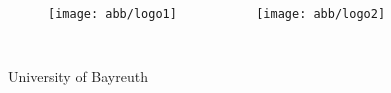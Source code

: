 


%


\thispagestyle{empty}


\begin{figure}[t]
 \centering
 \texttt{[image: abb/logo1]}
~~~~~~~~~~
 \texttt{[image: abb/logo2]}
\end{figure}


\begin{verbatim}


\end{verbatim}

\begin{center}
\Large{University of Bayreuth}\\
\end{center}


